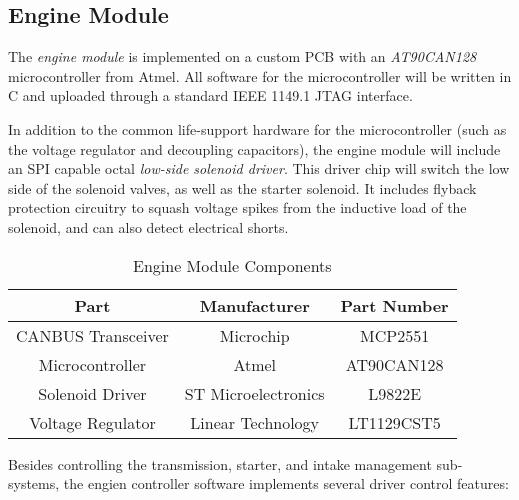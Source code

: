 \subsection{Engine Module}

The \emph{engine module} is implemented on a custom PCB with an \emph{AT90CAN128} microcontroller from Atmel. All software for the microcontroller will be written in C and uploaded through a standard IEEE 1149.1 JTAG interface. 

In addition to the common life-support hardware for the microcontroller (such as the voltage regulator and decoupling capacitors), the engine module will include an SPI capable octal \emph{low-side solenoid driver}. This driver chip will switch the low side of the solenoid valves, as well as the starter solenoid. It includes flyback protection circuitry to squash voltage spikes from the inductive load of the solenoid, and can also detect electrical shorts. 

\begin{table}[H]
	\caption{Engine Module Components\label{tab:Engine-Module}}
	\centering
	\begin{tabular}{|c|c|c|}
		\hline 
		Part & Manufacturer & Part Number\tabularnewline
		\hline \hline
		CANBUS Transceiver & Microchip & MCP2551\tabularnewline 
		Microcontroller & Atmel & AT90CAN128\tabularnewline 
		Solenoid Driver & ST Microelectronics & L9822E\tabularnewline
		Voltage Regulator & Linear Technology & LT1129CST5\tabularnewline		
		\hline
	\end{tabular}
\end{table}

Besides controlling the transmission, starter, and intake management sub-systems, the engien controller software implements several driver control features:

